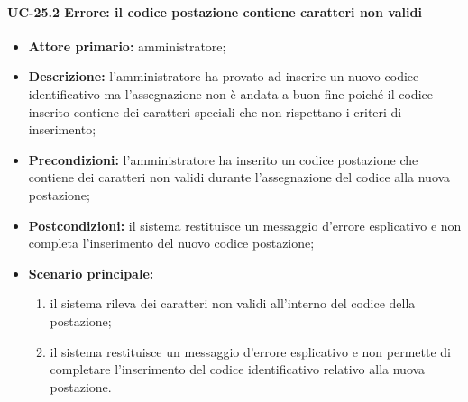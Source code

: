 \paragraph{UC-25.2 Errore: il codice postazione contiene caratteri non validi}
\begin{itemize}
	\item \textbf{Attore primario:} amministratore;
	\item \textbf{Descrizione:} l'amministratore ha provato ad inserire un nuovo codice identificativo ma l'assegnazione non è andata a buon fine poiché il codice inserito contiene dei caratteri speciali che non rispettano i criteri di inserimento;
	\item \textbf{Precondizioni:} l'amministratore ha inserito un codice postazione che contiene dei caratteri non validi durante l'assegnazione del codice alla nuova postazione;
	\item \textbf{Postcondizioni:} il sistema restituisce un messaggio d'errore esplicativo e non completa l'inserimento del nuovo codice postazione;
	\item \textbf{Scenario principale:}
	      \begin{enumerate}
		      \item il sistema rileva dei caratteri non validi all'interno del codice della postazione;
		      \item il sistema restituisce un messaggio d'errore esplicativo e non permette di completare l'inserimento del codice identificativo relativo alla nuova postazione.
	      \end{enumerate}
\end{itemize}


